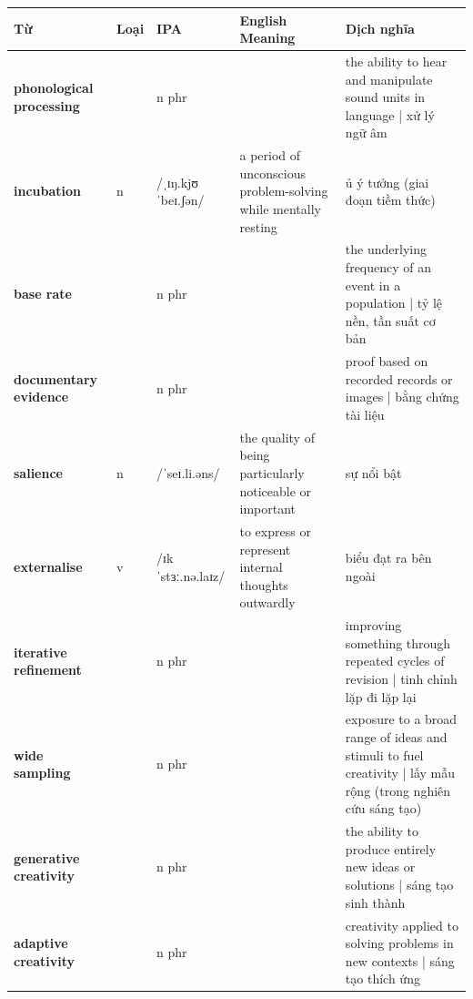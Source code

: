 \vspace{0.8em}
\begin{center}
\renewcommand{\arraystretch}{1.65}
\begin{tabularx}{\textwidth}{|V{0.22\textwidth}|C{0.07\textwidth}|I{0.20\textwidth}|Y|V{0.18\textwidth}|}
\hline
{}
\textbf{Từ} & \textbf{Loại} & \textbf{IPA} & \textbf{English Meaning} & \textbf{Dịch nghĩa} \\
\hline
\textbf{phonological processing} & & n phr & & the ability to hear and manipulate sound units in language | xử lý ngữ âm \\ \hline
\textbf{incubation} & n & /ˌɪŋ.kjʊˈbeɪ.ʃən/ & a period of unconscious problem-solving while mentally resting & ủ ý tưởng (giai đoạn tiềm thức) \\ \hline
\textbf{base rate} & & n phr & & the underlying frequency of an event in a population | tỷ lệ nền, tần suất cơ bản \\ \hline
\textbf{documentary evidence} & & n phr & & proof based on recorded records or images | bằng chứng tài liệu \\ \hline
\textbf{salience} & n & /ˈseɪ.li.əns/ & the quality of being particularly noticeable or important & sự nổi bật \\ \hline
\textbf{externalise} & v & /ɪkˈstɜː.nə.laɪz/ & to express or represent internal thoughts outwardly & biểu đạt ra bên ngoài \\ \hline
\textbf{iterative refinement} & & n phr & & improving something through repeated cycles of revision | tinh chỉnh lặp đi lặp lại \\ \hline
\textbf{wide sampling} & & n phr & & exposure to a broad range of ideas and stimuli to fuel creativity | lấy mẫu rộng (trong nghiên cứu sáng tạo) \\ \hline
\textbf{generative creativity} & & n phr & & the ability to produce entirely new ideas or solutions | sáng tạo sinh thành \\ \hline
\textbf{adaptive creativity} & & n phr & & creativity applied to solving problems in new contexts | sáng tạo thích ứng \\ \hline
\end{tabularx}
\end{center}

\newpage

